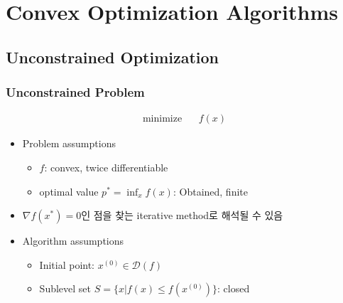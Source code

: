 \section{Convex Optimization Algorithms}

\subsection{Unconstrained Optimization}

\subsubsection*{Unconstrained Problem}
$$ \begin{aligned}
    \mathrm{minimize}~~&~~f(x)
\end{aligned} $$
\begin{itemize}
    \item Problem assumptions
    \begin{itemize}
        \item $f$: convex, twice differentiable
        \item optimal value $p^\ast = \inf_x f(x)$: Obtained, finite
    \end{itemize}
    \item $\nabla f(x^\ast) = 0$인 점을 찾는 iterative method로 해석될 수 있음
    \item Algorithm assumptions
    \begin{itemize}
        \item Initial point: $x^{(0)}\in\mathcal{D}(f)$
        \item Sublevel set $S = \{x|f(x)\leq f(x^{(0)})\}$: closed
    \end{itemize}
\end{itemize}

